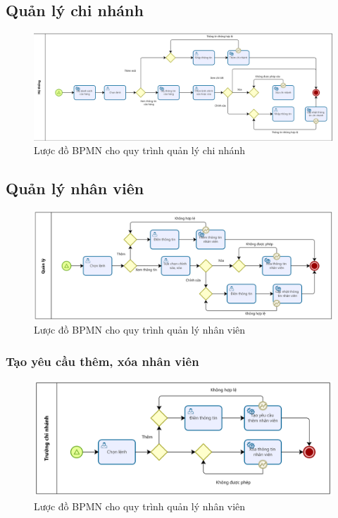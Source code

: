 \subsection{Quản lý chi nhánh}
\begin{figure}[!htp]
    \centering
    \includegraphics[width=14cm]{img/BPMN/Hien/Branch_management.png}
    \newline
    \caption{Lược đồ BPMN cho quy trình quản lý chi nhánh}
\end{figure}


\subsection{Quản lý nhân viên}
\begin{figure}[!htp]
    \centering
    \includegraphics[width=14cm]{img/BPMN/Hien/Employee_Management.png}
    \newline
    \caption{Lược đồ BPMN cho quy trình quản lý nhân viên}
\end{figure}

\subsubsection*{Tạo yêu cầu thêm, xóa nhân viên}
\begin{figure}[!htp]
    \centering
    \includegraphics[width=14cm]{img/BPMN/Hien/Employee_request.png}
    \newline
    \caption{Lược đồ BPMN cho quy trình quản lý nhân viên}
\end{figure}

